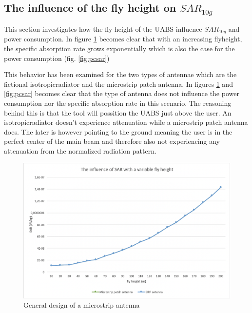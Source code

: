 \subsection{The influence of the fly height on $SAR_{10g}$}
\label{sub:senario1_influenceOfFlyHeight}

This section investigates how the fly height of the \gls{UABS} influence $SAR_{10g}$ and power consumption. In figure \ref{fig:fhsar}
becomes clear that with an increasing flyheight, the specific absorption rate grows exponentially which is also the case for the power consumption (fig. \ref{fig:pcsar})  

This behavior has been examined for the two types of antennae which are the fictional \gls{isotropicradiator} and the microstrip patch antenna. In figures 
\ref{fig:fhsar} and \ref{fig:pcsar} becomes clear that the type of antenna does not influence the power consumption nor the specific absorption rate in this  scenario.
The reasoning behind this is that the tool will possition the \gls{UABS} just above the user. An \gls{isotropicradiator} doesn't experience attenuation while a microstrip
patch antenna does. The later is however pointing to the ground meaning the user is in the perfect center of the main beam and therefore also
not experiencing any attenuation from the normalized radiation pattern.

\begin{figure}[th!]
  \includegraphics[width=\textwidth]{../results/s1/flyheight-sar.png}
  \caption{General design of a microstrip antenna}
  \label{fig:fhsar}
\end{figure}

